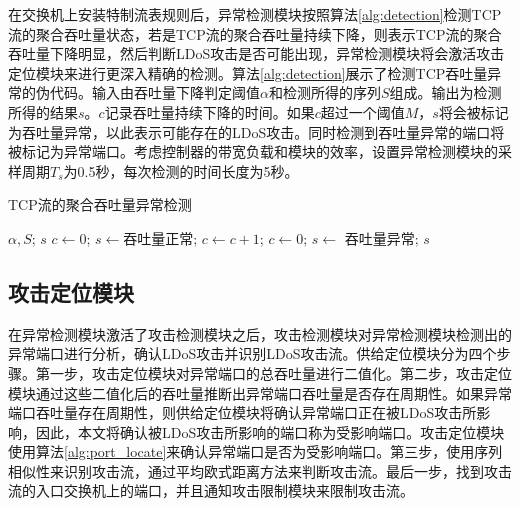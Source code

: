 在交换机上安装特制流表规则后，异常检测模块按照算法\ref{alg:detection}检测TCP流的聚合吞吐量状态，若是TCP流的聚合吞吐量持续下降，则表示TCP流的聚合吞吐量下降明显，然后判断LDoS攻击是否可能出现，异常检测模块将会激活攻击定位模块来进行更深入精确的检测。算法\ref{alg:detection}展示了检测TCP吞吐量异常的伪代码。输入由吞吐量下降判定阈值$\alpha$和检测所得的序列$S$组成。输出为检测所得的结果$s$。$c$记录吞吐量持续下降的时间。如果$c$超过一个阈值$M$，$s$将会被标记为吞吐量异常，以此表示可能存在的LDoS攻击。同时检测到吞吐量异常的端口将被标记为异常端口。考虑控制器的带宽负载和模块的效率，设置异常检测模块的采样周期$T_s$为0.5秒，每次检测的时间长度为5秒。

\renewcommand{\algorithmicrequire}{\textbf{输入:}}
\renewcommand{\algorithmicensure}{\textbf{输出:}}
\begin{algorithm}
	\small
	\caption{TCP流的聚合吞吐量异常检测}
	\label{alg:detection}
	\begin{algorithmic}[1]%
	\Require $\alpha, S$;
	\Ensure $s$
	\State $c \gets 0$;
	\State $s \gets $吞吐量正常;
			\State $c \gets c + 1$;
		\Else 
			\State $c \gets 0$;
		\EndIf
			\State $s \gets$ 吞吐量异常;
		\EndIf
	\EndFor
	\State \Return $s$
		
	\end{algorithmic}
\end{algorithm}

\subsection{攻击定位模块}
\label{chap4:Locator}

在异常检测模块激活了攻击检测模块之后，攻击检测模块对异常检测模块检测出的异常端口进行分析，确认LDoS攻击并识别LDoS攻击流。供给定位模块分为四个步骤。第一步，攻击定位模块对异常端口的总吞吐量进行二值化。第二步，攻击定位模块通过这些二值化后的吞吐量推断出异常端口吞吐量是否存在周期性。如果异常端口吞吐量存在周期性，则供给定位模块将确认异常端口正在被LDoS攻击所影响，因此，本文将确认被LDoS攻击所影响的端口称为受影响端口。攻击定位模块使用算法\ref{alg:port_locate}来确认异常端口是否为受影响端口。第三步，使用序列相似性来识别攻击流，通过平均欧式距离方法来判断攻击流。最后一步，找到攻击流的入口交换机上的端口，并且通知攻击限制模块来限制攻击流。




